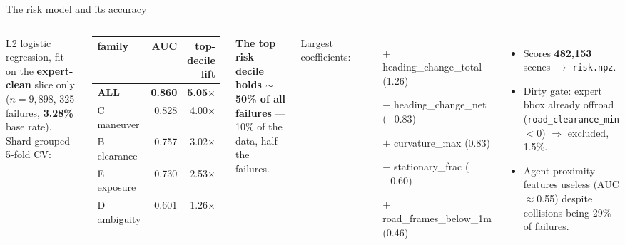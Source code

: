 \begin{frame}{The risk model and its accuracy}
  \small
  \begin{columns}[T]
    L2 logistic regression, fit on the \textbf{expert-clean} slice only
    ($n=9{,}898$, 325 failures, \textbf{3.28\%} base rate). Shard-grouped
    5-fold CV:
    \begin{center}
    \begin{tabular}{@{}lrr@{}}
      \toprule
      family & AUC & top-decile lift \\
      \midrule
      \textbf{ALL} & \textbf{0.860} & \textbf{5.05$\times$} \\
      C maneuver   & 0.828 & 4.00$\times$ \\
      B clearance  & 0.757 & 3.02$\times$ \\
      E exposure   & 0.730 & 2.53$\times$ \\
      D ambiguity  & 0.601 & 1.26$\times$ \\
      \bottomrule
    \end{tabular}
    \end{center}
    \textbf{The top risk decile holds $\sim$50\% of all failures} --- 10\% of
    the data, half the failures.

    Largest coefficients:
    \begin{itemize}\itemsep2pt
      \item[$+$] heading\_change\_total (1.26)
      \item[$-$] heading\_change\_net ($-0.83$)
      \item[$+$] curvature\_max (0.83)
      \item[$-$] stationary\_frac ($-0.60$)
      \item[$+$] road\_frames\_below\_1m (0.46)
    \end{itemize}
    \vspace{0.4em}
    \begin{itemize}\itemsep2pt
      \item Scores \textbf{482{,}153} scenes $\rightarrow$ \texttt{risk.npz}.
      \item Dirty gate: expert bbox already offroad
            (\texttt{road\_clearance\_min}$<0$) $\Rightarrow$ excluded, 1.5\%.
      \item Agent-proximity features useless (AUC $\approx$0.55) despite
            collisions being 29\% of failures.
    \end{itemize}
  \end{columns}
\end{frame}

